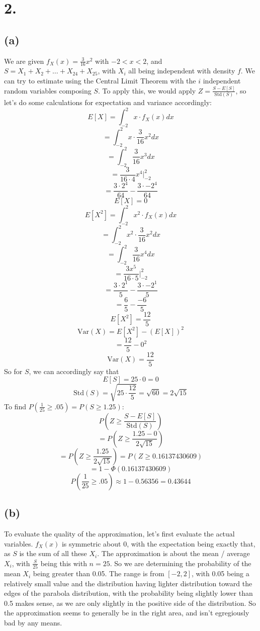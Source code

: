 \documentclass{article}
\begin{document}
{\Large 

\section*{2.}

\subsection*{(a)} 

We are given \(f_X(x) = \frac{3}{16}x^2\) with \(-2 < x < 2\), and \(S = X_1 + X_2 + \dots + X_{24} + X_{25}\), with \(X_i\) all being independent with density \(f\). We can try to estimate using the Central Limit Theorem with the \(i\) independent random variables composing \(S\). To apply this, we would apply \(Z = \frac{S - E[S]}{\text{Std}(S)}\), so let's do some calculations for expectation and variance accordingly:
\[
  E[X] = \int_{-2}^{2} x \cdot f_X(x) dx
\]
\[
  = \int_{-2}^{2} x \cdot \frac{3}{16}x^2 dx
\]
\[
  = \int_{-2}^{2} \frac{3}{16}x^3 dx
\]
\[
  = \frac{3}{16 \cdot 4}x^4 |_{-2}^{2}
\]
\[
  = \frac{3 \cdot 2^4}{64} - \frac{3 \cdot -2^4}{64}
\]
\[
  E[X] = 0
\]
\[
  E[X^2] = \int_{-2}^{2} x^2 \cdot f_X(x) dx
\]
\[
  = \int_{-2}^{2} x^2 \cdot \frac{3}{16}x^2 dx
\]
\[
  = \int_{-2}^{2} \frac{3}{16}x^4 dx
\]
\[
  = \frac{3x^5}{16 \cdot 5} |_{-2}^{2}
\]
\[
  = \frac{3 \cdot 2^1}{5} - \frac{3 \cdot -2^1}{5}
\]
\[
  = \frac{6}{5} - \frac{-6}{5} 
\]
\[
  E[X^2] = \frac{12}{5}
\]
\[
  \text{Var}(X) = E[X^2] - (E[X])^2
\]
\[
  = \frac{12}{5} - 0^2
\]
\[
  \text{Var}(X) = \frac{12}{5}
\]
So for \(S\), we can accordingly say that 
\[
  E[S] = 25 \cdot 0 = 0
\]
\[
  \text{Std}(S) = \sqrt{25 \cdot \frac{12}{5}} = \sqrt{60} = 2\sqrt{15}
\]
To find \(P(\frac{1}{25} \geq .05) = P(S \geq 1.25)\): 
\[
  P(Z \geq \frac{S - E[S]}{\text{Std}(S)})
\]
\[
  = P(Z \geq \frac{1.25 - 0}{2\sqrt{15}})
\]
\[
  = P(Z \geq \frac{1.25}{2\sqrt{15}}) = P(Z \geq 0.16137430609)
\]
\[
  = 1 - \Phi(0.16137430609)
\]
\[
  P(\frac{1}{25} \geq .05) \approx 1 - 0.56356 = \boxed{0.43644}
\]

\subsection*{(b)}

To evaluate the quality of the approximation, let's first evaluate the actual variables. \(f_X(x)\) is symmetric about 0, with the expectation being exactly that, as \(S\) is the sum of all these \(X_i\). The approximation is about the mean / average \(X_i\), with \(\frac{S}{25}\) being this with \(n = 25\). So we are determining the probability of the mean \(X_i\) being greater than 0.05. The range is from \([-2, 2]\), with 0.05 being a relatively small value and the distribution having lighter distribution toward the edges of the parabola distribution, with the probability being slightly lower than 0.5 makes sense, as we are only slightly in the positive side of the distribution. So the approximation seems to generally be in the right area, and isn't egregiously bad by any means.

}
\end{document}
